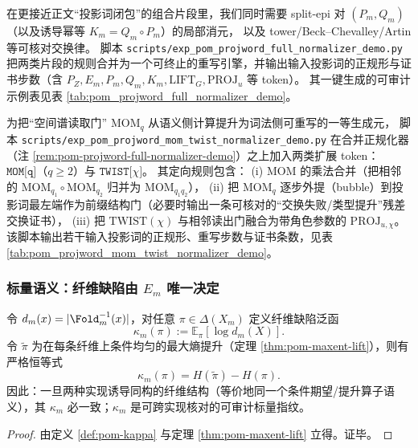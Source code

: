 \begin{remark}\label{rem:pom-projword-full-normalizer-demo}
在更接近正文“投影词闭包”的组合片段里，我们同时需要 split-epi 对 \((P_m,Q_m)\)（以及诱导幂等 \(K_m=Q_m\circ P_m\)）的局部消元，
以及 tower/Beck--Chevalley/Artin 等可核对交换律。
脚本 \texttt{scripts/exp\_pom\_projword\_full\_normalizer\_demo.py} 把两类片段的规则合并为一个可终止的重写引擎，并输出输入投影词的正规形与证书步数（含 \(P_Z,E_m,P_m,Q_m,K_m,\mathrm{LIFT}_G,\mathrm{PROJ}_u\) 等 token）。
其一键生成的可审计示例表见表 \ref{tab:pom_projword_full_normalizer_demo}。

\end{remark}

\begin{remark}\label{rem:pom-projword-mom-twist-normalizer-demo}
为把“空间谱读取门” \(\mathrm{MOM}_q\) 从语义侧计算提升为词法侧可重写的一等生成元，
脚本 \texttt{scripts/exp\_pom\_projword\_mom\_twist\_normalizer\_demo.py} 在合并正规化器（注 \ref{rem:pom-projword-full-normalizer-demo}）之上加入两类扩展 token：
\(\texttt{MOM[q]}\)（\(q\ge 2\)）与 \(\texttt{TWIST[}\chi\texttt{]}\)。
其定向规则包含：
(i) \(\mathrm{MOM}\) 的乘法合并（把相邻的 \(\mathrm{MOM}_{q_1}\circ\mathrm{MOM}_{q_2}\) 归并为 \(\mathrm{MOM}_{q_1q_2}\)），
(ii) 把 \(\mathrm{MOM}_q\) 逐步外提（bubble）到投影词最左端作为前缀结构门（必要时输出一条可核对的“交换失败/类型提升”残差交换证书），
(iii) 把 \(\mathrm{TWIST}(\chi)\) 与相邻读出门融合为带角色参数的 \(\mathrm{PROJ}_{u,\chi}\)。
该脚本输出若干输入投影词的正规形、重写步数与证书条数，见表 \ref{tab:pom_projword_mom_twist_normalizer_demo}。

\end{remark}

\subsubsection{标量语义：纤维缺陷由 \texorpdfstring{$E_m$}{Em} 唯一决定}
\begin{corollary}\label{cor:pom-kappa-derivable}
令 \(d_m(x)=|\Fold_m^{-1}(x)|\)，对任意 \(\pi\in\Delta(X_m)\) 定义纤维缺陷泛函
$$
\kappa_m(\pi):=\mathbb{E}_{\pi}[\log d_m(X)].
$$
令 \(\widetilde\pi\) 为在每条纤维上条件均匀的最大熵提升（定理 \ref{thm:pom-maxent-lift}），则有严格恒等式
$$
\kappa_m(\pi)=H(\widetilde\pi)-H(\pi).
$$
因此：一旦两种实现诱导同构的纤维结构（等价地同一个条件期望/提升算子语义），其 \(\kappa_m\) 必一致；\(\kappa_m\) 是可跨实现核对的可审计标量指纹。
\end{corollary}
\begin{proof}
由定义 \ref{def:pom-kappa} 与定理 \ref{thm:pom-maxent-lift} 立得。证毕。
\end{proof}

